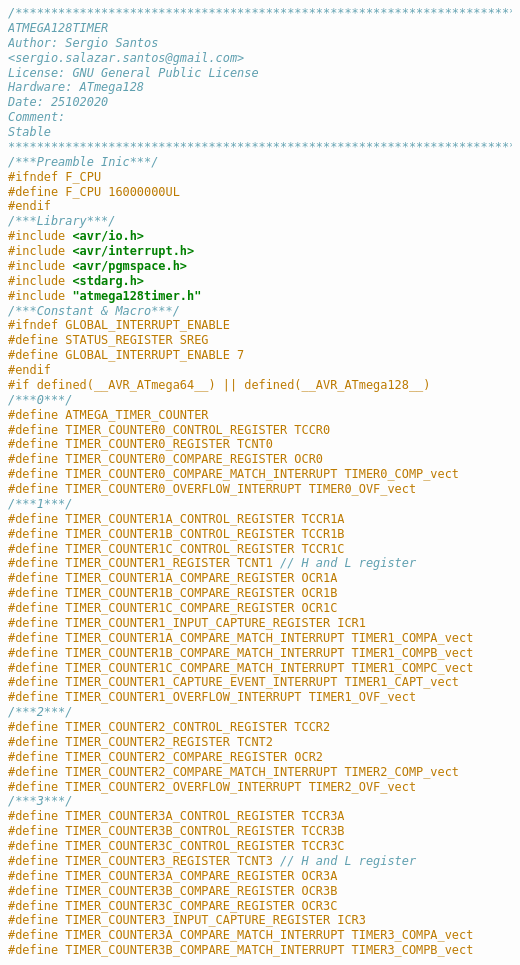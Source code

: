 \begin{lstlisting}[language=C]
/*************************************************************************
ATMEGA128TIMER
Author: Sergio Santos 
<sergio.salazar.santos@gmail.com>
License: GNU General Public License
Hardware: ATmega128
Date: 25102020
Comment:
Stable
*************************************************************************/
/***Preamble Inic***/
#ifndef F_CPU
#define F_CPU 16000000UL
#endif
/***Library***/
#include <avr/io.h>
#include <avr/interrupt.h>
#include <avr/pgmspace.h>
#include <stdarg.h>
#include "atmega128timer.h"
/***Constant & Macro***/
#ifndef GLOBAL_INTERRUPT_ENABLE
#define STATUS_REGISTER SREG
#define GLOBAL_INTERRUPT_ENABLE 7
#endif
#if defined(__AVR_ATmega64__) || defined(__AVR_ATmega128__)
/***0***/
#define ATMEGA_TIMER_COUNTER
#define TIMER_COUNTER0_CONTROL_REGISTER TCCR0
#define TIMER_COUNTER0_REGISTER TCNT0
#define TIMER_COUNTER0_COMPARE_REGISTER OCR0
#define TIMER_COUNTER0_COMPARE_MATCH_INTERRUPT TIMER0_COMP_vect
#define TIMER_COUNTER0_OVERFLOW_INTERRUPT TIMER0_OVF_vect
/***1***/
#define TIMER_COUNTER1A_CONTROL_REGISTER TCCR1A
#define TIMER_COUNTER1B_CONTROL_REGISTER TCCR1B
#define TIMER_COUNTER1C_CONTROL_REGISTER TCCR1C
#define TIMER_COUNTER1_REGISTER TCNT1 // H and L register
#define TIMER_COUNTER1A_COMPARE_REGISTER OCR1A
#define TIMER_COUNTER1B_COMPARE_REGISTER OCR1B
#define TIMER_COUNTER1C_COMPARE_REGISTER OCR1C
#define TIMER_COUNTER1_INPUT_CAPTURE_REGISTER ICR1
#define TIMER_COUNTER1A_COMPARE_MATCH_INTERRUPT TIMER1_COMPA_vect
#define TIMER_COUNTER1B_COMPARE_MATCH_INTERRUPT TIMER1_COMPB_vect
#define TIMER_COUNTER1C_COMPARE_MATCH_INTERRUPT TIMER1_COMPC_vect
#define TIMER_COUNTER1_CAPTURE_EVENT_INTERRUPT TIMER1_CAPT_vect
#define TIMER_COUNTER1_OVERFLOW_INTERRUPT TIMER1_OVF_vect
/***2***/
#define TIMER_COUNTER2_CONTROL_REGISTER TCCR2
#define TIMER_COUNTER2_REGISTER TCNT2
#define TIMER_COUNTER2_COMPARE_REGISTER OCR2
#define TIMER_COUNTER2_COMPARE_MATCH_INTERRUPT TIMER2_COMP_vect
#define TIMER_COUNTER2_OVERFLOW_INTERRUPT TIMER2_OVF_vect
/***3***/
#define TIMER_COUNTER3A_CONTROL_REGISTER TCCR3A
#define TIMER_COUNTER3B_CONTROL_REGISTER TCCR3B
#define TIMER_COUNTER3C_CONTROL_REGISTER TCCR3C
#define TIMER_COUNTER3_REGISTER TCNT3 // H and L register
#define TIMER_COUNTER3A_COMPARE_REGISTER OCR3A
#define TIMER_COUNTER3B_COMPARE_REGISTER OCR3B
#define TIMER_COUNTER3C_COMPARE_REGISTER OCR3C
#define TIMER_COUNTER3_INPUT_CAPTURE_REGISTER ICR3
#define TIMER_COUNTER3A_COMPARE_MATCH_INTERRUPT TIMER3_COMPA_vect
#define TIMER_COUNTER3B_COMPARE_MATCH_INTERRUPT TIMER3_COMPB_vect

\end{lstlisting}
